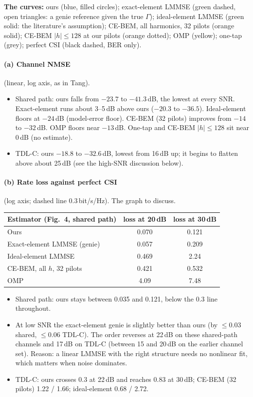 \documentclass[11pt,a4paper]{article}
\begin{document}
\textbf{The curves:} ours (blue, filled circles); exact-element LMMSE (green dashed, open triangles: a genie reference given
the true $\Gamma$); ideal-element LMMSE (green solid: the literature's assumption); CE-BEM, all harmonics, 32 pilots (orange
solid); CE-BEM $|h|\le128$ at our pilots (orange dotted); OMP (yellow); one-tap (grey); perfect CSI (black dashed, BER only).

\paragraph{(a) Channel NMSE} (linear, log axis, as in Tang).
\begin{itemize}
\item Shared path: ours falls from $-23.7$ to $-41.3$\,dB, the lowest at every SNR. Exact-element runs about 3--5\,dB above
ours ($-20.3$ to $-36.5$). Ideal-element floors at $-24$\,dB (model-error floor). CE-BEM (32 pilots) improves from $-14$ to
$-32$\,dB. OMP floors near $-13$\,dB. One-tap and CE-BEM $|h|\le128$ sit near 0\,dB (no estimate).
\item TDL-C: ours $-18.8$ to $-32.6$\,dB, lowest from 16\,dB up; it begins to flatten above about 25\,dB (see the
high-SNR discussion below).
\end{itemize}
\paragraph{(b) Rate loss against perfect CSI} (log axis; dashed line 0.3\,bit/s/Hz). The graph to discuss.
\begin{center}\small
\begin{tabular}{lcc}
\toprule
Estimator (Fig.~4, shared path) & loss at 20\,dB & loss at 30\,dB \\
\midrule
Ours & 0.070 & 0.121\\
Exact-element LMMSE (genie) & 0.057 & 0.209\\
Ideal-element LMMSE & 0.469 & 2.24\\
CE-BEM, all $h$, 32 pilots & 0.421 & 0.532\\
OMP & 4.09 & 7.48\\
\bottomrule
\end{tabular}
\end{center}
\begin{itemize}
\item Shared path: ours stays between 0.035 and 0.121, below the 0.3 line throughout.
\item At low SNR the exact-element genie is slightly better than ours (by $\le0.03$ shared, $\le0.06$ TDL-C). The order
reverses at 22\,dB on these shared-path channels and 17\,dB on TDL-C (between 15 and 20\,dB on the earlier channel set).
Reason: a linear LMMSE with the right structure needs no nonlinear fit, which matters when noise dominates.
\item TDL-C: ours crosses 0.3 at 22\,dB and reaches 0.83 at 30\,dB; CE-BEM (32 pilots) 1.22 / 1.66; ideal-element 0.68 / 2.72.
\end{itemize}
\end{document}
